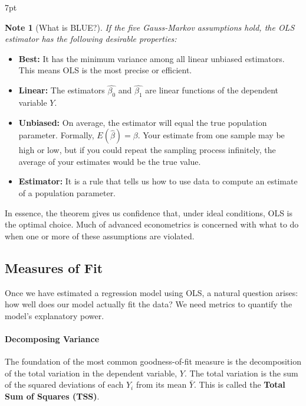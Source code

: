 \documentclass{article}
\providecommand{\tightlist}{
  \setlength{\itemsep}{0pt}
  \setlength{\parskip}{0pt}}
\newenvironment{blueblock}{
\def\FrameCommand{
  \hspace{1pt}
    {\color{DarkBlue}
    \vrule width 2pt}
    {\color{blueshade}
    \vrule width 4pt}
  \colorbox{blueshade}
}
\MakeFramed{
  \advance
  \hsize-
  \width
  \FrameRestore}
\noindent\hspace{-4.55pt}%
\begin{adjustwidth}{}{7pt}
\vspace{2pt}\vspace{2pt}
}
{\vspace{2pt}\end{adjustwidth}\endMakeFramed}
\newtheorem{note}{Note}
\begin{document}
\begin{blueblock}
\begin{note}[What is BLUE?]
If the five Gauss-Markov assumptions hold, the OLS estimator has the following desirable properties:
\end{note}
\begin{itemize}
    \tightlist
    \item \textbf{Best:} It has the minimum variance among all linear unbiased estimators. This means OLS is the most precise or efficient.
    \item \textbf{Linear:} The estimators $\hat{\beta_0}$ and $\hat{\beta_1}$ are linear functions of the dependent variable $Y$.
    \item \textbf{Unbiased:} On average, the estimator will equal the true population parameter. Formally, $E(\hat{\beta})=\beta$. Your estimate from one sample may be high or low, but if you could repeat the sampling process infinitely, the average of your estimates would be the true value.
    \item \textbf{Estimator:} It is a rule that tells us how to use data to compute an estimate of a population parameter.
\end{itemize}
In essence, the theorem gives us confidence that, under ideal conditions, OLS is the optimal choice. Much of advanced econometrics is concerned with what to do when one or more of these assumptions are violated.
\end{blueblock}



\subsection{Measures of Fit}

Once we have estimated a regression model using OLS, a natural question arises: how well does our model actually fit the data? We need metrics to quantify the model's explanatory power.

\paragraph{Decomposing Variance}

The foundation of the most common goodness-of-fit measure is the decomposition of the total variation in the dependent variable, $Y$. The total variation is the sum of the squared deviations of each $Y_i$ from its mean $\bar Y$. This is called the \textbf{Total Sum of Squares (TSS)}.
\end{document}
